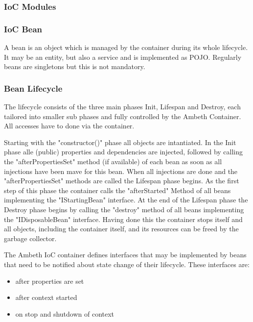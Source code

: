 \subsubsection{IoC Modules}
\TODO
\subsubsection{IoC Bean}
A bean is an object which is managed by the container during its whole lifecycle. It may be an entity, but also a service and is implemented as POJO. Regularly beans are singletons but this is not mandatory.

\subsubsection{Bean Lifecycle}

The lifecycle consists of the three main phases Init, Lifespan and Destroy, each tailored into smaller sub phases and fully controlled by the Ambeth Container. All accesses have to done via the container.

Starting with the "constructor()" phase all objects are intantiated. In the Init phase alle (public) properties and dependencies are injected, followed by calling the "afterPropertiesSet" method (if available) of each bean as soon as all injections have been mave for this bean.
When all injections are done and the "afterPropertiesSet" methods are called the Lifespan phase begins. As the first step of this phase the container calls the "afterStarted" Method of all beans implementing the "IStartingBean" interface.
At the end of the Lifespan phase the Destroy phase begins by calling the "destroy" method of all beans implementing the "IDisposableBean" interface. Having done this the container stops itself and all objects, including the container itself, and its resources can be freed by the garbage collector.

\def\showimgref{img/bean-lifecycle.png}

The Ambeth IoC container defines interfaces that may be implemented by beans that need to be notified about state change of their lifecycle. These interfaces are:

\begin{itemize}
	\item {} after properties are set
	\item {} after context started
	\item {} on stop and shutdown of context
\end{itemize}

